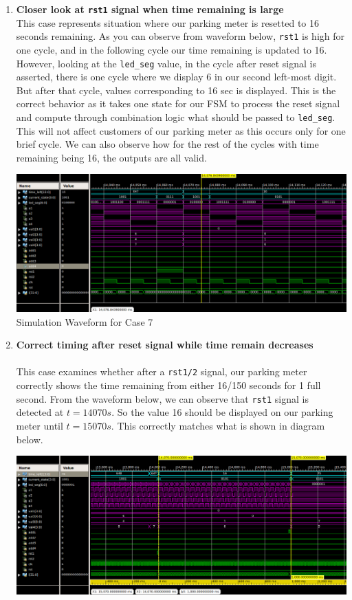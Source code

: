 \documentclass{article}
\begin{document}
\begin{enumerate}
    \item \textbf{Closer look at \texttt{rst1} signal when time remaining is large}   \\
    This case represents situation where our parking meter is resetted to 16 seconds remaining. As you can observe from waveform below, \texttt{rst1} is high for one cycle, and in the following cycle our time remaining is updated to 16. However, looking at the \texttt{led\_seg} value, in the cycle after reset signal is asserted, there is one cycle where we display 6 in our second left-most digit. But after that cycle, values corresponding to 16 sec is displayed. This is the correct behavior as it takes one state for our FSM to process the reset signal and compute through combination logic what should be passed to \texttt{led\_seg}. This will not affect customers of our parking meter as this occurs only for one brief cycle. We can also observe how for the rest of the cycles with time remaining being 16, the outputs are all valid.
    \begin{center}
        \includegraphics[scale=0.35]{waveform-7.png} \\
        \caption{Simulation Waveform for Case 7}
    \end{center}
    \item \textbf{Correct timing after reset signal while time remain decreases} \\ \\
    This case examines whether after a \texttt{rst1/2} signal, our parking meter correctly shows the time remaining from either 16/150 seconds for 1 full second. From the waveform below, we can observe that \texttt{rst1} signal is detected at $t=14070s$. So the value 16 should be displayed on our parking meter until $t=15070s$. This correctly matches what is shown in diagram below. 
    \begin{center}
        \includegraphics[scale=0.35]{waveform-8.png} \\

\end{center}
\end{enumerate}
\end{document}
